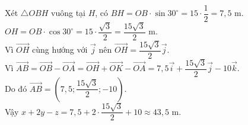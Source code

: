 \begin{bt}
{	Xét $\triangle O B H$ vuông tại $H$, có $B H=O B \cdot \sin 30^{\circ}=15 \cdot  \dfrac{1}{2}=7{,}5$ m.\\
	 $O H=O B \cdot \cos 30^{\circ}=15 \cdot\dfrac{\sqrt{3}}{2}=\dfrac{15 \sqrt{3}}{2}$ m.\\
	Vì $\overrightarrow{O H}$ cùng  hướng với $\overrightarrow{j}$ nên $\overrightarrow{O H}=\dfrac{15 \sqrt{3}}{2} \overrightarrow{j}$.\\
	Vì $\overrightarrow{A B}=\overrightarrow{O B}-\overrightarrow{O A}=\overrightarrow{O  H}+\overrightarrow{O K}-\overrightarrow{O A}=7,5 \overrightarrow{i}+\dfrac{15 \sqrt{3}}{2} \overrightarrow{j}-10 \overrightarrow{k}$.\\
	Do  đó $\overrightarrow{A B}=\left(7,5; \dfrac{15 \sqrt{3}}{2};-10\right)$.\\
Vậy $x+2 y-z=7{,}5+2 \cdot \dfrac{15 \sqrt{3}}{2}+10  \approx 43{,}5$ m.}
\end{bt}


